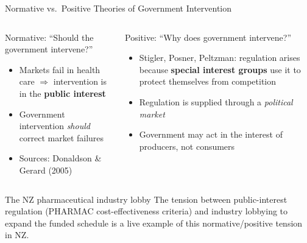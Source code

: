 \documentclass[aspectratio=169, 12pt]{beamer}
\begin{document}
\begin{frame}{Normative vs.\ Positive Theories of Government Intervention}
  \begin{columns}
      \begin{block}{Normative: ``Should the government intervene?''}
        \begin{itemize}
          \item Markets fail in health care $\Rightarrow$ intervention is in the \textbf{public interest}
          \item Government intervention \emph{should} correct market failures
          \item Sources: Donaldson \& Gerard (2005)
        \end{itemize}
      \end{block}
      \begin{alertblock}{Positive: ``Why does government intervene?''}
        \begin{itemize}
          \item Stigler, Posner, Peltzman: regulation arises because \textbf{special interest groups}
                use it to protect themselves from competition
          \item Regulation is supplied through a \textit{political market}
          \item Government may act in the interest of producers, not consumers
        \end{itemize}
      \end{alertblock}
  \end{columns}
  \vspace{0.4em}
  \begin{exampleblock}{The NZ pharmaceutical industry lobby}
    The tension between public-interest regulation (PHARMAC cost-effectiveness criteria) and
    industry lobbying to expand the funded schedule is a live example of this normative/positive
    tension in NZ.
  \end{exampleblock}
\end{frame}
\end{document}
